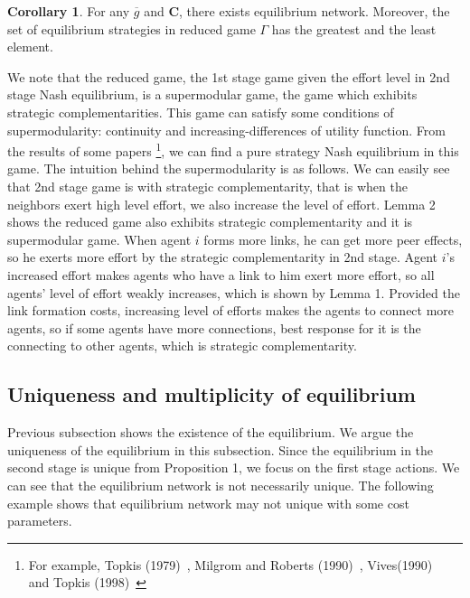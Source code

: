 \documentclass[12pt]{article}
\theoremstyle{definition}
\newtheorem{corollary}{Corollary}
\newcommand{\bm}[1]{\boldsymbol{#1}}
\begin{document}
\begin{corollary}
	For any $\overline{g}$ and $\bm{C}$, there exists equilibrium network.
	Moreover, the set of equilibrium strategies in reduced game $\Gamma$ has the greatest and the least element.
\end{corollary}

We note that the reduced game, the 1st stage game given the effort level in 2nd stage Nash equilibrium, is a supermodular game, the game which exhibits strategic complementarities.
This game can satisfy some conditions of supermodularity: continuity and increasing-differences of utility function.
From the results of some papers \footnote{For example, Topkis (1979)~\cite{topkis1979}, Milgrom and Roberts (1990)~\cite{milgromroberts}, Vives(1990)~\cite{vives} and Topkis (1998)~\cite{topkis1998}}, we can find a pure strategy Nash equilibrium in this game.
The intuition behind the supermodularity is as follows.
We can easily see that 2nd stage game is with strategic complementarity, that is when the neighbors exert high level effort, we also increase the level of effort.
Lemma 2 shows the reduced game also exhibits strategic complementarity and it is supermodular game.
When agent $i$ forms more links, he can get more peer effects, so he exerts more effort by the strategic complementarity in 2nd stage.
Agent $i$'s increased effort makes agents who have a link to him exert more effort, so all agents' level of effort weakly increases, which is shown by Lemma 1.
Provided the link formation costs, increasing level of efforts makes the agents to connect more agents, so if some agents have more connections, best response for it is the connecting to other agents, which is strategic complementarity.


\subsection{Uniqueness and multiplicity of equilibrium}

Previous subsection shows the existence of the equilibrium.
We argue the uniqueness of the equilibrium in this subsection.
Since the equilibrium in the second stage is unique from Proposition 1, we focus on the first stage actions.
We can see that the equilibrium network is not necessarily unique.
The following example shows that equilibrium network may not unique with some cost parameters.
\end{document}
